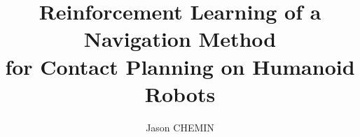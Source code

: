 %
%
%
% 
%

\usepackage[ED=EDSYS-Robo, Ets=INSA]{tlsflyleaf}
\title{\textbf{\large Reinforcement Learning of a Navigation Method \\for Contact Planning on Humanoid Robots}}
\author{Jason CHEMIN}

